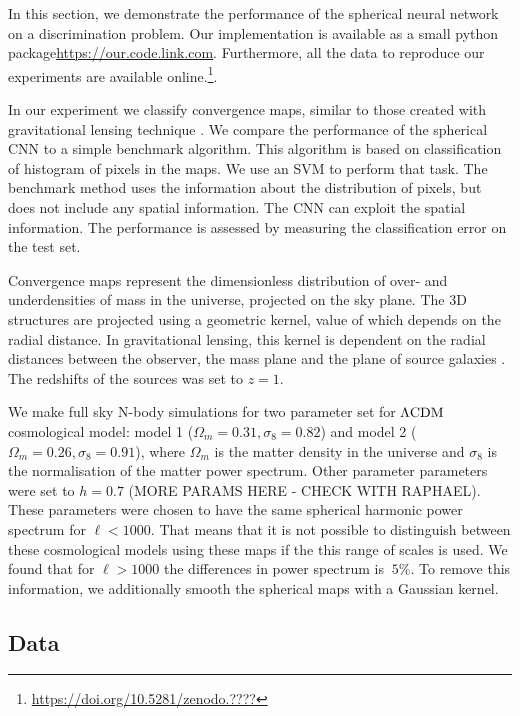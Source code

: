 \documentclass[final,twocolumn,3p,times,authoryear]{elsarticle}
\newcommand{\todo}[1]{{\color[rgb]{.6,.1,.6}{#1}}}
\newcommand{\1}{\b{1}}              %
\newcommand{\0}{\b{0}}              %
\begin{document}
In this section, we demonstrate the performance of the spherical neural network on a discrimination problem.
Our implementation is available as a small python package\url{https://our.code.link.com}.
Furthermore, all the data to reproduce our experiments are available online.\footnote{\url{https://doi.org/10.5281/zenodo.????} \todo{correct DOI}}.

In our experiment we classify convergence maps, similar to those created with gravitational lensing technique \citep{chang2017curvedsky}.
We compare the performance of the spherical CNN to a simple benchmark algorithm.
This algorithm is based on classification of histogram of pixels in the maps.
We use an SVM to perform that task.
The benchmark method uses the information about the distribution of pixels, but does not include any spatial information.
The CNN can exploit the spatial information.
The performance is assessed by measuring the classification error on the test set.

Convergence maps represent the dimensionless distribution of over- and underdensities of mass in the universe, projected on the sky plane.
The 3D structures are projected using a geometric kernel, value of which depends on the radial distance.
In gravitational lensing, this kernel is dependent on the radial distances between the observer, the mass plane and the plane of source galaxies \citep[see][for review of gravitational lensing]{bartelman2010gravitationallensing}.
The redshifts of the sources was set to $z=1$.

We make full sky N-body simulations for two parameter set for $\Lambda \rm{CDM} $ cosmological model: model 1 ($\Omega_m=0.31, \sigma_8=0.82$) and model 2 ($\Omega_m=0.26, \sigma_8=0.91$), where $\Omega_m$ is the matter density in the universe and $\sigma_8$ is the normalisation of the matter power spectrum.
Other parameter parameters were set to $h=0.7$ (MORE PARAMS HERE - CHECK WITH RAPHAEL).
These parameters were chosen to have the same spherical harmonic power spectrum for $\ell<1000$.
That means that it is not possible to distinguish between these cosmological models using these maps if the this range of scales is used.
We found that for $\ell>1000$ the differences in power spectrum is $~5\%$.
To remove this information, we additionally smooth the spherical maps with a Gaussian kernel.


\subsection{Data}
\label{sec:data}
\end{document}
